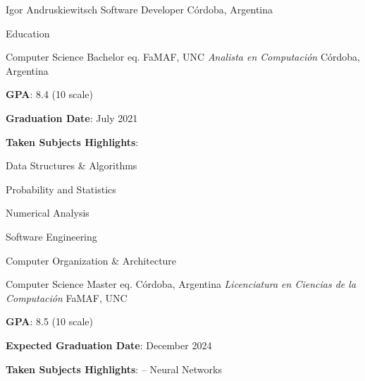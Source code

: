 \documentclass{curriculum}
\begin{document}

\begin{cvheader}

\makeheader
    {Igor Andruskiewitsch}  {}
    {Software Developer}    {}
    {Córdoba, Argentina}    {}

\end{cvheader}


\begin{cvsection}{Education}

    \makesectionitemheader
        {Computer Science Bachelor eq.}  {FaMAF, UNC}
        {\it{Analista en Computación}}   {Córdoba, Argentina}
        \begin{sectionitemlist}
        \item { \textbf{GPA}: 8.4 (10 scale) }
        \item { \textbf{Graduation Date}: July 2021 }
        \item { \textbf{Taken Subjects Highlights}: }
            \begin{colsectionitemlist}{3}
                \item{Data Structures \& Algorithms}
                \item{Probability and Statistics}
                \item{Numerical Analysis}
                \item{Software Engineering}
                \item{Computer Organization \& Architecture}
            \end{colsectionitemlist}
        \end{sectionitemlist}

    \makesectionitemheader
        {Computer Science Master eq.}                            {Córdoba, Argentina}
        {\it{Licenciatura en Ciencias de la Computación}}  {FaMAF, UNC}
        \begin{sectionitemlist}
        \item { \textbf{GPA}: 8.5 (10 scale) }
        \item { \textbf{Expected Graduation Date}: December 2024 }
        \item { \textbf{Taken Subjects Highlights}: – Neural Networks}
        \end{sectionitemlist}

\end{cvsection}
\end{document}

